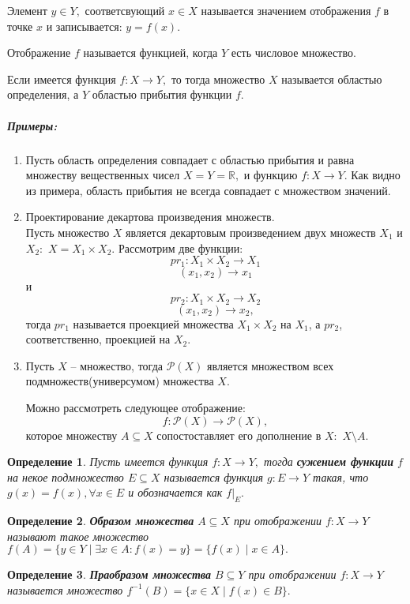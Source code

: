 \documentclass{article}
\newtheorem{Definition}{Определение}[section]
\begin{document}
Элемент $y\in Y,$ соответсвующий $x\in X$ называется значением отображения $f$ в точке $x$ и записывается: $y=f(x).$

Отображение $f$ называется функцией, когда $Y$ есть числовое множество.

Если имеется функция $f:X \rightarrow Y,$ то тогда множество $X$ называется областью определения, а $Y$ областью прибытия функции $f.$

\subparagraph{Примеры:}
\begin{enumerate}
\item Пусть область определения совпадает с областью прибытия и равна множеству вещественных чисел $X=Y=\mathbb{R},$ и функцию $f:X \rightarrow Y.$ Как видно из примера, область прибытия не всегда совпадает с множеством значений.
\item Проектирование декартова произведения множеств.
\\Пусть множество $X$ является декартовым произведением двух множеств $X_1$ и $X_2:$ $X=X_1 \times X_2.$ Рассмотрим две функции: $$pr_1:X_1\times X_2 \rightarrow X_1$$
$$(x_1,x_2) \rightarrow x_1$$
и $$pr_2:X_1\times X_2 \rightarrow X_2$$
$$(x_1,x_2) \rightarrow x_2,$$
тогда $pr_1$ называется проекцией множества $X_1\times X_2$ на $X_1$, а $pr_2$, соответственно, проекцией на $X_2.$
\item Пусть $X$ -- множество, тогда $\mathcal{P}(X)$ является множеством всех подмножеств(универсумом) множества $X.$

Можно рассмотреть следующее отображение: $$f:\mathcal{P}(X) \rightarrow \mathcal{P}(X),$$ которое множеству $A\subseteq X$ сопостоставляет его дополнение в $X:$ $X\setminus A.$
\end{enumerate}

\begin{Definition}
Пусть имеется функция $f:X \rightarrow Y,$ тогда {\bf сужением функции} $f$ на некое подмножество $E\subseteq X$ называется функция $g:E\rightarrow Y$ такая, что $g(x) = f(x), \forall x\in E$ и обозначается как $f|_{E}.$
\end{Definition}

\begin{Definition}
{\bf Образом множества} $A\subseteq X$ при отображении $f:X \rightarrow Y$ называют такое множество $f(A) = \{y\in Y\mid \exists x\in A: f(x)=y\} = \{f(x)\mid x\in A\}.$
\end{Definition}

\begin{Definition}
{\bf Праобразом множества} $B\subseteq Y$ при отображении $f:X\rightarrow Y$ называется множество $f^{-1}(B) = \{x\in X\mid f(x)\in B\}.$
\end{Definition}
\end{document}
